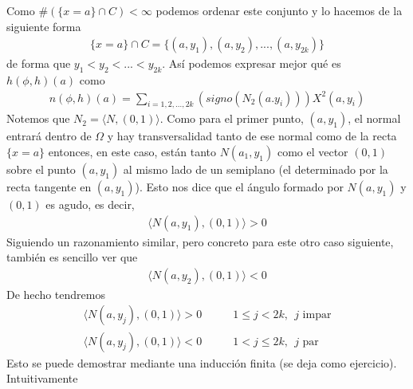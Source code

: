 Como $\#(\{x=a\} \cap C)<\infty$ podemos ordenar este conjunto y lo hacemos de la siguiente forma
\begin{gather*}
    \{x=a\}\cap C = \{(a,y_1), (a,y_2), ..., (a,y_{2k})\}
\end{gather*}
de forma que $y_1<y_2<...<y_{2k}$. Así podemos expresar mejor qué es $h(\phi, h)(a)$ como
\begin{gather*}
    n(\phi, h)(a) = \sum_{i=1, 2, ..., 2k} (signo (N_2(a.y_i)))X^2(a,y_i)
\end{gather*}
Notemos que $N_2 = \langle N, (0,1) \rangle$. Como para el primer punto, $(a,y_1)$, el normal entrará dentro de $\Omega$ y hay transversalidad tanto de ese normal como de la recta $\{x=a\}$ entonces, en este caso, están tanto $N(a_1, y_1)$ como el vector $(0,1)$ sobre el punto $(a,y_1)$ al mismo lado de un semiplano (el determinado por la recta tangente en $(a,y_1)$). Esto nos dice que el ángulo formado por $N(a,y_1)$ y $(0,1)$ es agudo, es decir,
\begin{gather*}
    \langle N(a, y_1) , (0,1) \rangle > 0
\end{gather*}
Siguiendo un razonamiento similar, pero concreto para este otro caso siguiente, también es sencillo ver que
\begin{gather*}
    \langle N(a, y_2) , (0,1) \rangle < 0
\end{gather*}
De hecho tendremos 
\begin{align*}
    \langle N(a, y_j) , (0,1) \rangle > 0 &\qquad 1 \leq j < 2k,\ \ j \text{ impar}\\
    \langle N(a, y_j) , (0,1) \rangle < 0 &\qquad 1 < j \leq 2k,\ \ j \text{ par}
\end{align*}
Esto se puede demostrar mediante una inducción finita (se deja como ejercicio). Intuitivamente

